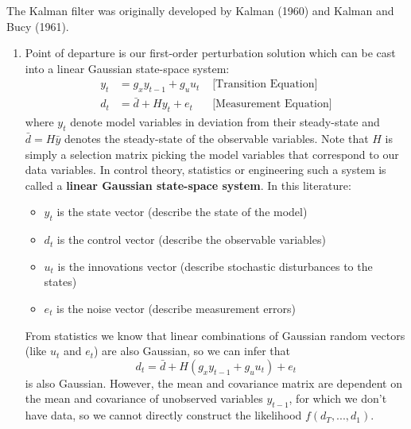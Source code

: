 The Kalman filter was originally developed by Kalman (1960) and Kalman and Bucy (1961).
\begin{enumerate}
	\item Point of departure is our first-order perturbation solution which can be cast into a linear Gaussian state-space system:
	\begin{align*}
		y_t &= g_x y_{t-1} + g_u u_t &\text{  [Transition Equation]}
		\\
		d_t &= \bar{d} + H y_t + e_t       &\text{  [Measurement Equation]}
	\end{align*}
	where $y_t$ denote model variables in deviation from their steady-state and $\bar{d}=H\bar{y}$ denotes the steady-state of the observable variables. Note that $H$ is simply a selection matrix picking the model variables that correspond to our data variables. In control theory, statistics or engineering such a system is called a \textbf{linear Gaussian state-space system}. In this literature:
	\begin{itemize}
		\item $y_t$ is the state vector (describe the state of the model)
		\item $d_t$ is the control vector (describe the observable variables)
		\item $u_t$ is the innovations vector (describe stochastic disturbances to the states)
		\item $e_t$ is the noise vector (describe measurement errors)
	\end{itemize}
	From statistics we know that linear combinations of Gaussian random vectors (like $u_t$ and $e_t$) are also Gaussian, so we can infer that
	$$d_t = \bar{d} +  H(g_x y_{t-1} + g_u u_t) + e_t$$
	is also Gaussian. However, the mean and covariance matrix are dependent on the mean and covariance of unobserved variables $y_{t-1}$, for which we don't have data, so we cannot directly construct the likelihood $f(d_T,...,d_1)$.
	

\end{enumerate}
